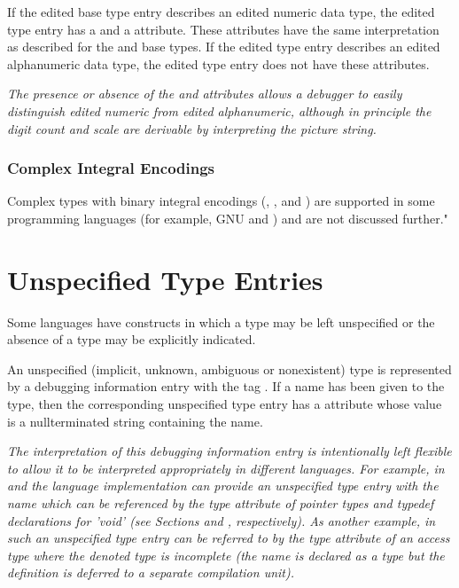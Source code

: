 If the edited base type entry describes an edited numeric
data type, the edited type entry has a \DWATdigitcount{} and a
\DWATdecimalscale{} attribute.
These attributes have the same
interpretation as described for the
\DWATEpackeddecimal{} and
\DWATEnumericstring{} base
types. If the edited type entry
describes an edited alphanumeric data type, the edited type
entry does not have these attributes.

\textit{The presence or absence of the \DWATdigitcount{} and
\DWATdecimalscale{} attributes
allows a debugger to easily
distinguish edited numeric from edited alphanumeric, although
in principle the digit count and scale are derivable by
interpreting the picture string.}

\bb
\subsubsection{Complex Integral Encodings}
\label{chap:complexintegralencodings}
Complex types with binary integral encodings (\DWATEcomplexsigned,
\DWATEimaginarysigned, \DWATEcomplexunsigned{} and
\DWATEimaginaryunsigned) are supported in some programming
languages (for example, GNU \C{} and \Rust) and are not discussed further."
\eb

\section{Unspecified Type Entries}
\label{chap:unspecifiedtypeentries}
Some languages have constructs in which a type
may be left unspecified or the absence of a type
may be explicitly indicated.

An unspecified (implicit, unknown, ambiguous or nonexistent)
type is represented by a debugging information entry with
the tag \DWTAGunspecifiedtypeTARG.
If a name has been given
to the type, then the corresponding unspecified type entry
has a \DWATname{} attribute
whose value is
a null\dash terminated
string containing the name.

\textit{The interpretation of this debugging information entry is
intentionally left flexible to allow it to be interpreted
appropriately in different languages. For example, in \C{} and
\Cplusplus{} the language implementation can provide an unspecified type
entry with the name  which can be referenced by the
type attribute of pointer types and typedef declarations for
'void' (see Sections  and
\db
{},
respectively). As another
example, in  such an unspecified type entry can be referred
to by the type attribute of an access type where the denoted
type is incomplete (the name is declared as a type but the
definition is deferred to a separate compilation unit).}

